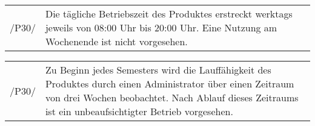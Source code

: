 \begin{tabular}{p{1.5cm}p{14.5cm}}	
	 /P30/& Die tägliche Betriebszeit des Produktes erstreckt werktags jeweils von 08:00 Uhr bis 20:00 Uhr. Eine Nutzung am Wochenende ist nicht vorgesehen. \\[0.25cm]
\end{tabular}

\begin{tabular}{p{1.5cm}p{14.5cm}}	
	 /P30/& Zu Beginn jedes Semesters wird die Lauffähigkeit des Produktes durch einen Administrator über einen Zeitraum von drei Wochen beobachtet. Nach Ablauf dieses Zeitraums ist ein unbeaufsichtigter Betrieb vorgesehen. \\[0.25cm]
\end{tabular}
